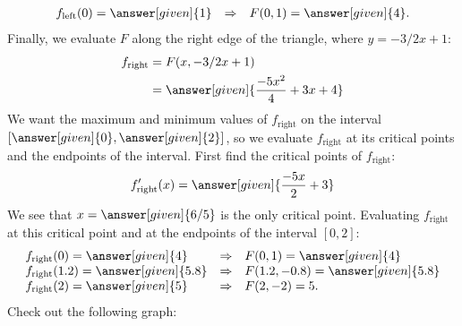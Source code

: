 \documentclass{ximera}
\begin{document}
\begin{example}
\begin{explanation}
\[\begin{array}{lcl}
      f_{\mathrm{left}}(0) = \answer[given]{1} &\Rightarrow & F(0,1) = \answer[given]{4}.
    \end{array}
    \]
    Finally, we evaluate $F$ along the right edge of the triangle,
    where $y = -3/2x+1$:
    \begin{align*}
      f_{\mathrm{right}} &= F(x,-3/2x+1)\\
      &= \answer[given]{\frac{-5x^2}{4}+3x+4}
    \end{align*}
    We want the maximum and minimum values of $f_{\mathrm{right}}$ on
    the interval $[\answer[given]{0},\answer[given]{2}]$, so we
    evaluate $f_{\mathrm{right}}$ at its critical points and the
    endpoints of the interval. First find the critical points of
    $f_{\mathrm{right}}$:
    \[
    f'_{\mathrm{right}}(x) = \answer[given]{\frac{-5x}{2}+3}
    \]
    We see that $x = \answer[given]{6/5}$ is the only critical point.
    Evaluating $f_{\mathrm{right}}$ at this critical point and at the
    endpoints of the interval $[0,2]$:
    \[
    \begin{array}{lcl}
      f_{\mathrm{right}}(0) = \answer[given]{4} &\Rightarrow & F(0,1) = \answer[given]{4}\\
      f_{\mathrm{right}}(1.2) = \answer[given]{5.8} &\Rightarrow &  F(1.2,-0.8) = \answer[given]{5.8}\\
      f_{\mathrm{right}}(2) = \answer[given]{5} &\Rightarrow&  F(2,-2) = 5.
    \end{array}
    \]
    Check out the following graph:
    \begin{image}
\end{image}
\end{explanation}
\end{example}
\end{document}
